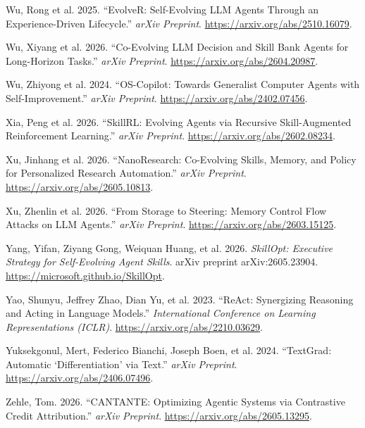 \documentclass[
]{article}
\newlength{\cslhangindent}
\newenvironment{CSLReferences}[2] %
 {\begin{list}{}{%
  \setlength{\itemindent}{0pt}
  \setlength{\leftmargin}{0pt}
  \setlength{\parsep}{0pt}
  \ifodd #1
   \setlength{\leftmargin}{\cslhangindent}
   \setlength{\itemindent}{-1\cslhangindent}
  \fi
  \setlength{\itemsep}{#2\baselineskip}}}
 {\end{list}}
\begin{document}
\begin{CSLReferences}{1}{1}
{Wu, Rong et al.} 2025. {``{EvolveR}: Self-Evolving {LLM} Agents Through
an Experience-Driven Lifecycle.''} \emph{arXiv Preprint}.
\url{https://arxiv.org/abs/2510.16079}.

{Wu, Xiyang et al.} 2026. {``Co-Evolving {LLM} Decision and Skill Bank
Agents for Long-Horizon Tasks.''} \emph{arXiv Preprint}.
\url{https://arxiv.org/abs/2604.20987}.

{Wu, Zhiyong et al.} 2024. {``{OS-Copilot}: Towards Generalist Computer
Agents with Self-Improvement.''} \emph{arXiv Preprint}.
\url{https://arxiv.org/abs/2402.07456}.

{Xia, Peng et al.} 2026. {``{SkillRL}: Evolving Agents via Recursive
Skill-Augmented Reinforcement Learning.''} \emph{arXiv Preprint}.
\url{https://arxiv.org/abs/2602.08234}.

{Xu, Jinhang et al.} 2026. {``{NanoResearch}: Co-Evolving Skills,
Memory, and Policy for Personalized Research Automation.''} \emph{arXiv
Preprint}. \url{https://arxiv.org/abs/2605.10813}.

{Xu, Zhenlin et al.} 2026. {``From Storage to Steering: Memory Control
Flow Attacks on {LLM} Agents.''} \emph{arXiv Preprint}.
\url{https://arxiv.org/abs/2603.15125}.

Yang, Yifan, Ziyang Gong, Weiquan Huang, et al. 2026. \emph{{SkillOpt}:
Executive Strategy for Self-Evolving Agent Skills}. arXiv preprint
arXiv:2605.23904. \url{https://microsoft.github.io/SkillOpt}.

Yao, Shunyu, Jeffrey Zhao, Dian Yu, et al. 2023. {``{ReAct}: Synergizing
Reasoning and Acting in Language Models.''} \emph{International
Conference on Learning Representations (ICLR)}.
\url{https://arxiv.org/abs/2210.03629}.

Yuksekgonul, Mert, Federico Bianchi, Joseph Boen, et al. 2024.
{``{TextGrad}: Automatic {`Differentiation'} via Text.''} \emph{arXiv
Preprint}. \url{https://arxiv.org/abs/2406.07496}.

Zehle, Tom. 2026. {``{CANTANTE}: Optimizing Agentic Systems via
Contrastive Credit Attribution.''} \emph{arXiv Preprint}.
\url{https://arxiv.org/abs/2605.13295}.


\end{CSLReferences}
\end{document}
